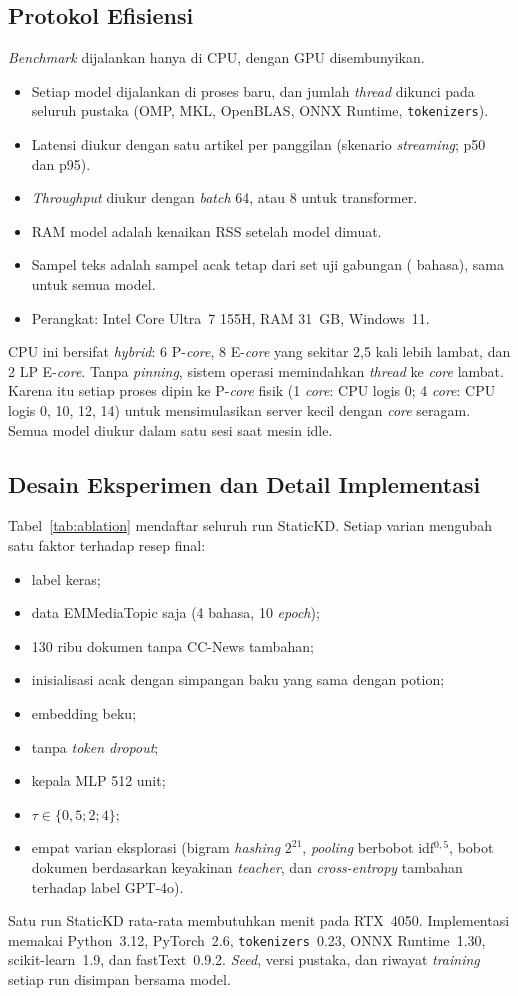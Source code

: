 \documentclass[journal]{IEEEtran}
\newcommand{\eng}[1]{\textit{#1}}   %
\begin{document}
\subsection{Protokol Efisiensi}
\label{sec:effprotocol}
\eng{Benchmark} dijalankan hanya di CPU, dengan GPU disembunyikan.
\begin{itemize}
  \item Setiap model dijalankan di proses baru, dan jumlah \eng{thread} dikunci pada seluruh pustaka (OMP, MKL, OpenBLAS, ONNX Runtime, \texttt{tokenizers}).
  \item Latensi diukur dengan satu artikel per panggilan (skenario \eng{streaming}; p50 dan p95).
  \item \eng{Throughput} diukur dengan \eng{batch} 64, atau 8 untuk transformer.
  \item RAM model adalah kenaikan RSS setelah model dimuat.
  \item Sampel teks adalah sampel acak tetap dari set uji gabungan ( bahasa), sama untuk semua model.
  \item Perangkat: Intel Core Ultra~7 155H, RAM 31~GB, Windows~11.
\end{itemize}
CPU ini bersifat \eng{hybrid}: 6 P-\eng{core}, 8 E-\eng{core} yang sekitar 2,5 kali lebih lambat, dan 2 LP E-\eng{core}. Tanpa \eng{pinning}, sistem operasi memindahkan \eng{thread} ke \eng{core} lambat. Karena itu setiap proses dipin ke P-\eng{core} fisik (1 \eng{core}: CPU logis 0; 4 \eng{core}: CPU logis 0, 10, 12, 14) untuk mensimulasikan server kecil dengan \eng{core} seragam. Semua model diukur dalam satu sesi saat mesin idle.

\subsection{Desain Eksperimen dan Detail Implementasi}
Tabel~\ref{tab:ablation} mendaftar seluruh  run StaticKD. Setiap varian mengubah satu faktor terhadap resep final:
\begin{itemize}
  \item label keras;
  \item data EMMediaTopic saja (4 bahasa, 10 \eng{epoch});
  \item 130 ribu dokumen tanpa CC-News tambahan;
  \item inisialisasi acak dengan simpangan baku yang sama dengan potion;
  \item embedding beku;
  \item tanpa \eng{token dropout};
  \item kepala MLP 512 unit;
  \item $\tau\in\{0{,}5; 2; 4\}$;
  \item empat varian eksplorasi (bigram \eng{hashing} $2^{21}$, \eng{pooling} berbobot idf$^{0,5}$, bobot dokumen berdasarkan keyakinan \eng{teacher}, dan \eng{cross-entropy} tambahan terhadap label GPT-4o).
\end{itemize}
Satu run StaticKD rata-rata membutuhkan  menit pada RTX~4050. Implementasi memakai Python~3.12, PyTorch~2.6, \texttt{tokenizers}~0.23, ONNX Runtime~1.30, scikit-learn~1.9, dan fastText~0.9.2. \eng{Seed}, versi pustaka, dan riwayat \eng{training} setiap run disimpan bersama model.
\end{document}
